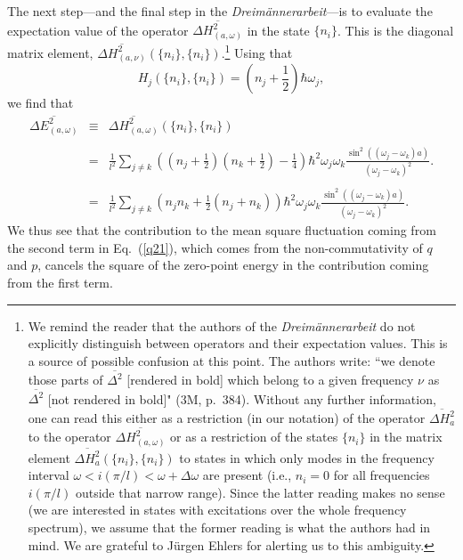 \documentclass{elsart}
\begin{document}
The next step---and the final step in the {\it Dreim\"annerarbeit}---is to evaluate the expectation value of the operator $\overline{\Delta H_{(a, \omega)}^2}$ in the state $\{n_i\}$. This is the diagonal matrix element, $\overline{\Delta H_{(a, \nu)}^2}(\{n_i\}, \{n_i\})$.\footnote{We remind the reader that the authors of the {\it Dreim\"annerarbeit} do not explicitly distinguish between operators and their expectation values. This is a source of possible confusion at this point. The authors write: ``we denote those parts of $\overline{\Delta^2}$ [rendered in bold] which belong to a given frequency $\nu$ as $\overline{\Delta^2}$ [not rendered in bold]" (3M, p.\ 384). Without any further information, one can read this either as a restriction (in our notation) of the operator $\overline{\Delta H_a^2}$ to the operator $\overline{\Delta H_{(a, \omega)}^2}$ or as a restriction of the states $\{ n_i \}$ in the matrix element $\overline{\Delta H_a^2}(\{n_i\}, \{n_i\})$ to states in which only modes in the frequency interval $\omega < i (\pi/l) < \omega+\Delta\omega$ are present (i.e., $n_i = 0$ for all frequencies $i (\pi/l)$ outside that narrow range). Since the latter reading makes no sense (we are interested in states  with excitations over the whole frequency spectrum), we assume that the former reading is what the authors had in mind. We are grateful to J\"urgen Ehlers for alerting us to this ambiguity.} 
Using that
\begin{equation}
H_j(\{ n_i \}, \{ n_i \}) = \left( n_j + \frac{1}{2} \right) \hbar \omega_j,
\label{q21c}
\end{equation}
we find that
\newpage
\begin{eqnarray}
\overline{\Delta E_{(a, \omega)}^2} & \equiv & \overline{\Delta H_{(a, \omega)}^2}(\{n_i\}, \{n_i \}) \nonumber \\
 & & \nonumber \\
& = &   \frac{1}{l^2}  \sum_{j \neq k} \left(  \left( n_j + \frac{1}{2} \right) \left( n_k + \frac{1}{2} \right)  - 
\frac{1}{4} \right) \hbar^2 \omega_j \omega_k     \frac{\sin^2{((\omega_j - \omega_k)a)}}{(\omega_j - \omega_k)^2}.  \nonumber \\
 & & \nonumber \\
 & = & \frac{1}{l^2}  \sum_{j \neq k} \left( n_j n_k + \frac{1}{2} \left( n_j + n_k \right)  \right) \hbar^2 \omega_j \omega_k   \frac{\sin^2{((\omega_j - \omega_k)a)}}{(\omega_j - \omega_k)^2}.
\label{q24} 
 \end{eqnarray}
 We thus see that the contribution to the mean square fluctuation coming from the second term in Eq.\ (\ref{q21}), which comes from the non-commutativity of $q$ and $p$, cancels the square of the zero-point energy in the contribution coming from  the first term.
 
\end{document}
